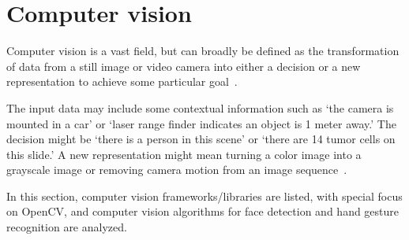 %
\section{Computer vision}
\label{sec:computer-vision}
Computer vision is a vast field, but can broadly be defined as the
transformation of data from a still image or video camera into
either a decision or a new representation to achieve some particular goal~\cite{kaehler2016learning}.

The input data may include some contextual information
such as `the camera is mounted in a car' or `laser range finder indicates an
object is 1 meter away.'
The decision might be `there is a person in this scene' or `there are 14
tumor cells on this slide.'
A new representation might mean turning a color image
into a grayscale image or removing camera motion from an image
sequence~\cite{kaehler2016learning}.

In this section, computer vision frameworks/libraries are listed, with special
focus on OpenCV, and computer vision algorithms for face detection and hand
gesture recognition are analyzed.
%

